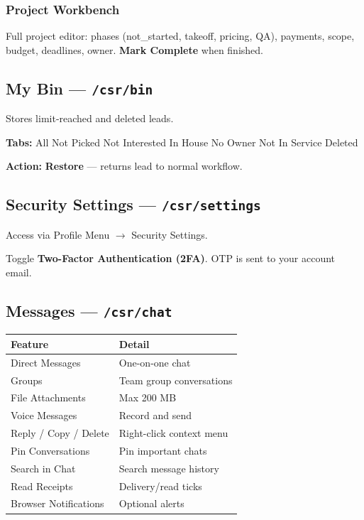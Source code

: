 \documentclass[11pt,a4paper]{article}
\begin{document}
\subsubsection{Project Workbench}
Full project editor: phases (not\_started, takeoff, pricing, QA), payments, scope, budget, deadlines, owner. \textbf{Mark Complete} when finished.

\subsection{My Bin --- \texttt{/csr/bin}}

Stores limit-reached and deleted leads.

\textbf{Tabs:} All \textbar{} Not Picked \textbar{} Not Interested \textbar{} In House \textbar{} No Owner \textbar{} Not In Service \textbar{} Deleted

\textbf{Action:} \textbf{Restore} --- returns lead to normal workflow.

\subsection{Security Settings --- \texttt{/csr/settings}}

Access via Profile Menu $\rightarrow$ Security Settings.

Toggle \textbf{Two-Factor Authentication (2FA)}. OTP is sent to your account email.

\subsection{Messages --- \texttt{/csr/chat}}

\begin{longtable}{@{}p{4cm}p{10cm}@{}}
\toprule
\textbf{Feature} & \textbf{Detail} \\
\midrule
Direct Messages     & One-on-one chat \\
Groups              & Team group conversations \\
File Attachments    & Max 200 MB \\
Voice Messages      & Record and send \\
Reply / Copy / Delete & Right-click context menu \\
Pin Conversations   & Pin important chats \\
Search in Chat      & Search message history \\
Read Receipts       & Delivery/read ticks \\
Browser Notifications & Optional alerts \\
\bottomrule
\end{longtable}
\end{document}

